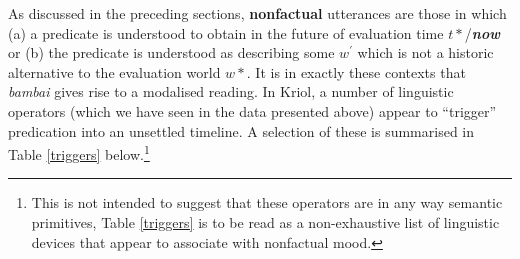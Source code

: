 

As discussed in the preceding sections, \textbf{nonfactual} utterances are those in which  (a) a predicate is understood to obtain in the future of evaluation time $t*$/\textbf{\textit{now}} or (b) the predicate is understood as describing some $w^\prime$ which is not a historic alternative to the evaluation world $w*$. It is in exactly these contexts that \textit{bambai} gives rise to a modalised reading. In Kriol, a number of linguistic operators (which we have seen in the data presented above) appear to ``trigger'' predication into an unsettled timeline. A selection of these is summarised in Table \ref{triggers} below.\footnote{This is not intended to suggest that these operators are in any way semantic primitives, Table \ref{triggers} is to be read as a non-exhaustive list of linguistic devices that appear to associate with nonfactual mood.}

